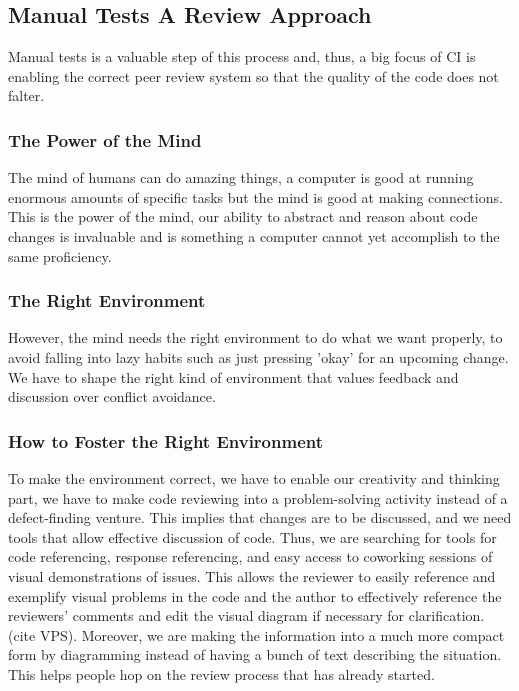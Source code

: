 \documentclass{article}
\begin{document}
\subsection{Manual Tests A Review Approach}

Manual tests is a valuable step of this process and, thus, a big focus of CI is enabling the
correct peer review system so that the quality of the code does not falter.


\subsubsection{The Power of the Mind}
The mind of humans can do amazing things, a computer is good at running enormous amounts of
specific tasks but the mind is good at making connections. This is the power of the mind, our ability
to abstract and reason about code changes is invaluable and is something a computer cannot yet accomplish to the same proficiency.

\subsubsection{The Right Environment}
However, the mind needs the right environment to do what we want properly, to avoid falling into
lazy habits such as just pressing 'okay' for an upcoming change. We have to shape the right kind of
environment that values feedback and discussion over conflict avoidance.

\subsubsection{How to Foster the Right Environment}
To make the environment correct, we have to enable our creativity and thinking part, we have
to make code reviewing into a problem-solving activity instead of a defect-finding venture.
This implies that changes are to be discussed, and we need tools that allow effective discussion of code. Thus, we are searching for tools for code referencing, response referencing, and easy access to coworking sessions of visual demonstrations of issues. This allows the reviewer to easily reference and exemplify visual 
problems in the code and the author to effectively reference the reviewers' comments and edit the visual diagram if necessary for clarification.  (cite VPS). Moreover, we are making the information into a much more compact form by diagramming instead of having a bunch of text describing the situation. This helps people hop on the review process that has already started.
\end{document}
